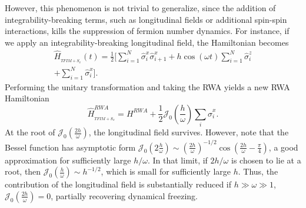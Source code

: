 \documentclass[%
reprint,
superscriptaddress,
amsmath,amssymb,
aps,
prb,
showkeys,
]{revtex4-2}
\begin{document}
	However, this phenomenon is not trivial to generalize, since the addition of integrability-breaking terms, such as longitudinal fields or additional spin-spin interactions, kills the suppression of fermion number dynamics.  For instance, if we apply an integrability-breaking longitudinal field, the Hamiltonian becomes 
	\begin{multline}
		\hat{H}_{_{TFIM+S_{x}}}(t) =\frac12 \Big[\sum^N_{i=1}  \hat{\sigma}_{i}^{x} \hat{\sigma}_{i+1}^{x}+h \cos (\omega t) \sum^N_{i=1} \hat{\sigma}_{i}^{z}\\
		+\sum^N_{i=1} \hat{\sigma}_{i}^{x}\Big].
		\label{eq:tfim_sx}
	\end{multline}	
	Performing the unitary transformation and taking the RWA yields a new RWA Hamiltonian
	\begin{equation}
		\hat{H}_{_{TFIM+S_{x}}}^{R W A}= H^{RWA}+\frac12 \mathcal{J}_{0}\left(\frac{h}{\omega}\right) \sum_i\hat{\sigma}^x_i.
		\label{eq:tfim_sx1}
	\end{equation}
	At the root of $\mathcal{J}_0\left(\frac{2h}{\omega}\right)$, the longitudinal field survives. However, note that the Bessel function has asymptotic form $\mathcal{J}_0\left(2\frac{h}{\omega}\right)\sim \left(\frac{2h}{\omega}\right)^{-1/2}\cos\left(\frac{2h}{\omega}-\frac{\pi}{4}\right)$, a good approximation for sufficiently  large $h/\omega$. In that limit, if $2h/\omega$ is chosen to lie at a root, then $\mathcal{J}_0\left(\frac{h}{\omega}\right) \sim h^{-1/2}$, which is small for sufficiently large $h$. Thus, the contribution of the longitudinal field is substantially reduced if $h\gg\omega\gg1$, $\mathcal{J}_0\left(\frac{2h}{\omega}\right)=0$, partially recovering dynamical freezing.
\end{document}
